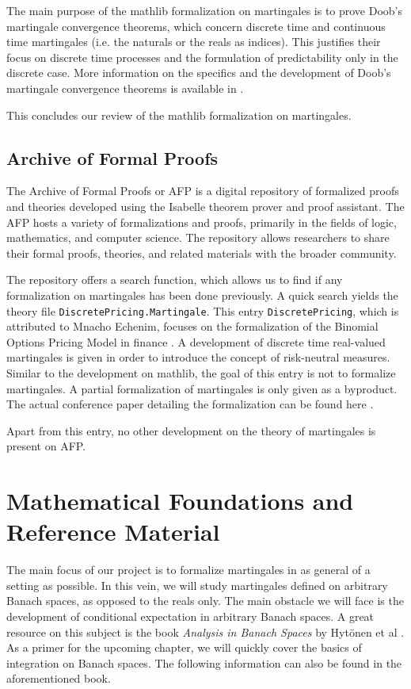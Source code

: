 The main purpose of the \textsf{mathlib} formalization on martingales is to prove Doob's martingale convergence theorems, which concern discrete time and continuous time martingales (i.e. the naturals or the reals as indices). This justifies their focus on discrete time processes and the formulation of predictability only in the discrete case. More information on the specifics and the development of Doob's martingale convergence theorems is available in \cite{ying2022formalization}.

This concludes our review of the \textsf{mathlib} formalization on martingales.

\subsection{Archive of Formal Proofs}

The \textsf{Archive of Formal Proofs} or \textsf{\ac{AFP}} is a digital repository of formalized proofs and theories developed using the Isabelle theorem prover and proof assistant. The \textsf{\ac{AFP}}  hosts a variety of formalizations and proofs, primarily in the fields of logic, mathematics, and computer science. The repository allows researchers to share their formal proofs, theories, and related materials with the broader community.

The repository offers a search function, which allows us to find if any formalization on martingales has been done previously. A quick search yields the theory file \texttt{DiscretePricing.Martingale}. This entry \texttt{DiscretePricing}, which is attributed to Mnacho Echenim, focuses on the formalization of the Binomial Options Pricing Model in finance \cite{DiscretePricing-AFP}. A development of discrete time real-valued martingales is given in order to introduce the concept of risk-neutral measures. Similar to the development on \textsf{mathlib}, the goal of this entry is not to formalize martingales. A partial formalization of martingales is only given as a byproduct. The actual conference paper detailing the formalization can be found here \cite{EchenimPeltier}.

Apart from this entry, no other development on the theory of martingales is present on \textsf{\ac{AFP}}.

\section{Mathematical Foundations and Reference Material}

The main focus of our project is to formalize martingales in as general of a setting as possible. In this vein, we will study martingales defined on arbitrary Banach spaces, as opposed to the reals only. The main obstacle we will face is the development of conditional expectation in arbitrary Banach spaces. A great resource on this subject is the book \textit{Analysis in Banach Spaces} by Hytönen et al \cite{Hytoenen_2016}. As a primer for the upcoming chapter, we will quickly cover the basics of integration on Banach spaces. The following information can also be found in the aforementioned book.

